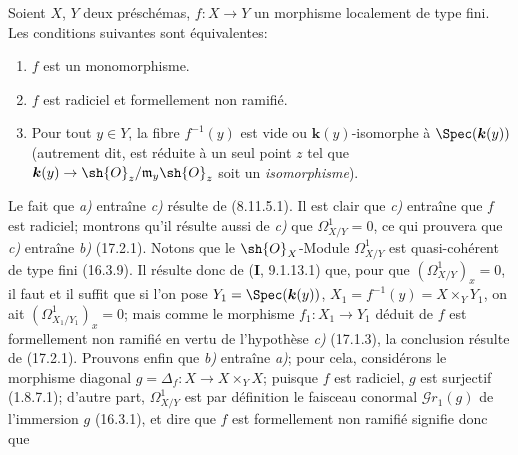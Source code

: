 \begin{proposition}[17.2.6]
\label{IV.17.2.6}
Soient $X$, $Y$ deux préschémas, $f:X\to Y$ un morphisme localement de type fini. Les conditions suivantes sont équivalentes:
\begin{enumerate}
  \item[\textup{a)}] $f$ est un monomorphisme.
  \item[\textup{b)}] $f$ est radiciel et formellement non ramifié.
  \item[\textup{c)}] Pour tout $y\in Y$, la fibre $f^{-1}(y)$ est vide ou $\boldsymbol{k}(y)$-isomorphe à $\Spec(\boldsymbol{k}(y))$ \textup{(autrement dit, est réduite à un seul point $z$ tel que} $\boldsymbol{k}(y)\to\sh{O}_z/\mathfrak{m}_y\sh{O}_z$ \textup{soit un \emph{isomorphisme})}.
\end{enumerate}
\end{proposition}

Le fait que \emph{a)} entraîne \emph{c)} résulte de (8.11.5.1). Il est clair que \emph{c)} entraîne que $f$ est radiciel; montrons qu'il résulte aussi de \emph{c)} que $\varOmega_{X/Y}^1=0$, ce qui prouvera que \emph{c)} entraîne \emph{b)} (17.2.1). Notons que le $\sh{O}_X$-Module $\varOmega_{X/Y}^1$ est quasi-cohérent de type fini (16.3.9). Il résulte donc de (\textbf{I}, 9.1.13.1) que, pour que $(\varOmega_{X/Y}^1)_x=0$, il faut et il suffit que si l'on pose $Y_1=\Spec(\boldsymbol{k}(y))$, $X_1=f^{-1}(y)=X\times_Y Y_1$, on ait $(\varOmega_{X_1/Y_1}^1)_x=0$; mais comme le morphisme $f_1:X_1\to Y_1$ déduit de $f$ est formellement non ramifié en vertu de l'hypothèse \emph{c)} (17.1.3), la conclusion résulte de (17.2.1). Prouvons enfin que \emph{b)} entraîne \emph{a)}; pour cela, considérons le morphisme diagonal $g=\Delta_f:X\to X\times_Y X$; puisque $f$ est radiciel, $g$ est surjectif (1.8.7.1); d'autre part, $\varOmega_{X/Y}^1$ est par définition le faisceau conormal $\mathscr{G}r_1(g)$ de l'immersion $g$ (16.3.1), et dire que $f$ est formellement non ramifié signifie donc que
